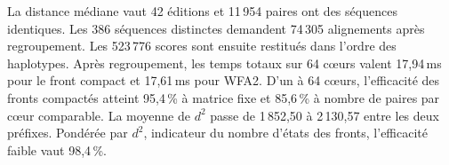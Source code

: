 La distance médiane vaut 42 éditions et 11\,954 paires ont des séquences identiques. Les 386 séquences distinctes demandent 74\,305 alignements après regroupement. Les 523\,776 scores sont ensuite restitués dans l’ordre des haplotypes. Après regroupement, les temps totaux sur 64 cœurs valent 17,94\,ms pour le front compact et 17,61\,ms pour WFA2. D’un à 64 cœurs, l’efficacité des fronts compactés atteint 95,4\,\% à matrice fixe et 85,6\,\% à nombre de paires par cœur comparable. La moyenne de \(d^2\) passe de 1\,852,50 à 2\,130,57 entre les deux préfixes. Pondérée par \(d^2\), indicateur du nombre d’états des fronts, l’efficacité faible vaut 98,4\,\%.

